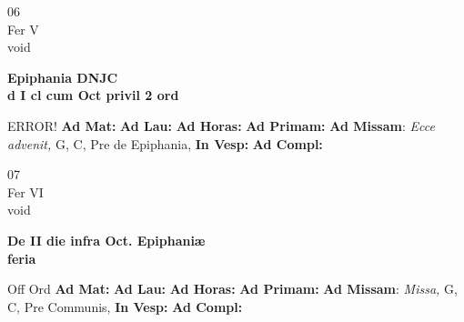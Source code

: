 \documentclass[10pt, openany]{book}
\begin{document}
    \begin{center}
        \begin{minipage}{3.5in}
            \vspace{2em}
            \begin{minipage}{0.5in}
                {\Huge 06} \\
                {\normalsize Fer V} \\
                {\normalsize void}
            \end{minipage}
            \begin{minipage}{3.0in}
                \textbf{ \large Epiphania DNJC \\
                \textnormal{\normalsize d I cl cum Oct privil 2 ord}} \\ 
            \end{minipage}
            \begin{justify}ERROR!
                \textbf{Ad Mat: }
                \textbf{Ad Lau: }
                \textbf{Ad Horas: }
                \textbf{Ad Primam: }\textbf{Ad Missam}: \textit{Ecce advenit,} G, C, Pre de Epiphania,  
                \textbf{In Vesp: }
                \textbf{Ad Compl: }
            \end{justify}
        \end{minipage}
    \end{center}

    \begin{center}
        \begin{minipage}{3.5in}
            \vspace{2em}
            \begin{minipage}{0.5in}
                {\Huge 07} \\
                {\normalsize Fer VI} \\
                {\normalsize void}
            \end{minipage}
            \begin{minipage}{3.0in}
                \textbf{ \large De II die infra Oct. Epiphaniæ \\
                \textnormal{\normalsize feria}} \\ 
            \end{minipage}
            \begin{justify}Off Ord
                \textbf{Ad Mat: }
                \textbf{Ad Lau: }
                \textbf{Ad Horas: }
                \textbf{Ad Primam: }\textbf{Ad Missam}: \textit{Missa,} G, C, Pre Communis,  
                \textbf{In Vesp: }
                \textbf{Ad Compl: }
            \end{justify}
        \end{minipage}
    \end{center}
\end{document}
